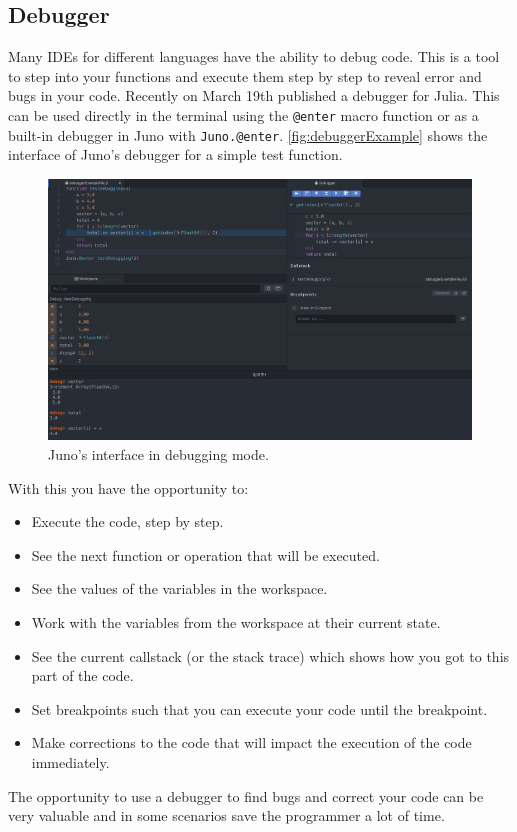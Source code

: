\subsection{Debugger}
\label{sec:debugger}
Many IDEs for different languages have the ability to debug code. This is a tool to step into your functions and execute them step by step to reveal error and bugs in your code. Recently on March 19th \citet{Debugger} published a debugger for Julia. This can be used directly in the terminal using the \texttt{@enter} macro function or as a built-in debugger in Juno with \texttt{Juno.@enter}. \autoref{fig:debuggerExample} shows the interface of Juno's debugger for a simple test function.
\begin{figure}[htb]
    \centering
    \includegraphics[width = \textwidth]{figures/debugger_screenshot.png}
    \caption{Juno's interface in debugging mode.}
    \label{fig:debuggerExample}
\end{figure}
With this you have the opportunity to:
\begin{itemize}
    \item Execute the code, step by step.
    \item See the next function or operation that will be executed.
    \item See the values of the variables in the workspace.
    \item Work with the variables from the workspace at their current state.
    \item See the current callstack (or the stack trace) which shows how you got to this part of the code.
    \item Set breakpoints such that you can execute your code until the breakpoint.
    \item Make corrections to the code that will impact the execution of the code immediately.
\end{itemize}
The opportunity to use a debugger to find bugs and correct your code can be very valuable and in some scenarios save the programmer a lot of time. 

